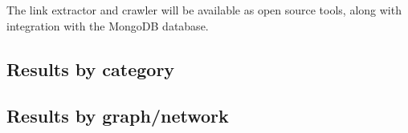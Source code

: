 The link extractor and crawler will be available as open source tools, along with integration with the MongoDB database.








\subsection{Results by category}

\subsection{Results by graph/network}







